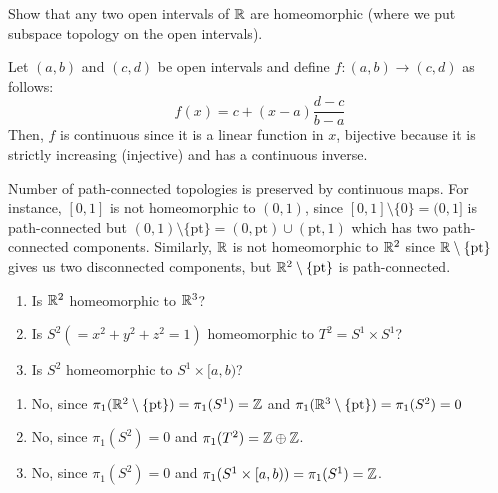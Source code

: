 \documentclass[12pt]{amsart}
\begin{document}
\begin{example}
    Show that any two open intervals of $\mathbb R$ are homeomorphic (where we put subspace topology on the open intervals). 
\end{example}    

\begin{solution}
    Let $(a,b)$ and $(c,d)$ be open intervals and define $f: (a,b) \to (c,d)$ as follows: 
    \[f(x) = c + (x-a) \frac{d-c}{b-a}\]
    Then, $f$ is continuous since it is a linear function in $x$, bijective because it is strictly increasing (injective) and has a continuous inverse. 
\end{solution}

\begin{remark}
    Number of path-connected topologies is preserved by continuous maps. For instance, $[0,1]$ is not homeomorphic to $(0,1)$, since $[0,1] \setminus \{0\} = (0,1]$ is path-connected but $(0, 1) \setminus \{\text{pt}\} = (0, \text{pt}) \cup (\text{pt}, 1)$ which has two path-connected components. 
    Similarly, $\mathbb R$ is not homeomorphic to $\mathbb R^2$ since $\mathbb R \setminus \{\text{pt}\}$ gives us two disconnected components, but $\mathbb R^2 \setminus \{\text{pt}\}$ is path-connected.    
\end{remark}

\begin{example}
    \bbni 
    \begin{enumerate}[label=(\alph*),ref=\theenumi\alph*]
        \item Is $\mathbb R^2$ homeomorphic to $\mathbb R^3$? 
        \item Is $S^2 ( = x^2 + y^2 + z^2  = 1)$ homeomorphic to $T^2 = S^1 \times S^1$?
        \item Is $S^2$ homeomorphic to $S^1 \times [a,b)$? 
    \end{enumerate}
\end{example}

\begin{solution}
    \bbni 
    \begin{enumerate}[label=(\alph*),ref=\theenumi\alph*]
        \item No, since  $\pi_1(\mathbb R^2 \setminus \{\text{pt}\}) = \pi_1(S^1) = \mathbb Z$ and $\pi_1(\mathbb R^3 \setminus \{\text{pt}\}) = \pi_1(S^2) = 0$
        \item No, since $\pi_1(S^2) = 0$ and $\pi_1(T^2) = \mathbb Z \oplus \mathbb Z$. 
        \item No, since $\pi_1(S^2) = 0$ and $\pi_1(S^1 \times [a,b)) = \pi_1(S^1) = \mathbb Z$. 
    \end{enumerate}
\end{solution}
    
\end{document}

